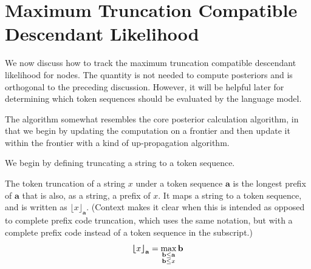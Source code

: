 \section{Maximum Truncation Compatible Descendant Likelihood}
\label{sec:maximum-descendant-likelihood}
We now discuss how to track the maximum truncation compatible descendant likelihood for nodes.
The quantity is not needed to compute posteriors and is orthogonal to the 
preceding discussion. However, it will be helpful later for determining
which token sequences should be evaluated by the language model.

The algorithm somewhat resembles the core posterior calculation algorithm, in that we
begin by updating the computation on a frontier and then update it within the frontier with
a kind of up-propagation algorithm.

We begin by defining truncating a string to a token sequence.
\begin{definition}
    The token truncation of a string $x$ under a token sequence $\mathbf{a}$ is the longest prefix
    of $\mathbf{a}$ that is also, as a string, a prefix of $x$. It maps a string to a token sequence,
    and is written as $\lfloor x \rfloor_{\mathbf{a}}$. (Context makes it clear when 
    this is intended as opposed to complete prefix code truncation, which uses the same notation,
    but with a complete prefix code instead of a token sequence in the subscript.)
    $$
    {\bm{\lfloor}} x {\bm{\rfloor}}_{\mathbf{a}} = \max_{\substack{\mathbf{b} \leq \mathbf{a} \\ \mathbf{b} \leq x}} \mathbf{b}
    $$
\end{definition}

